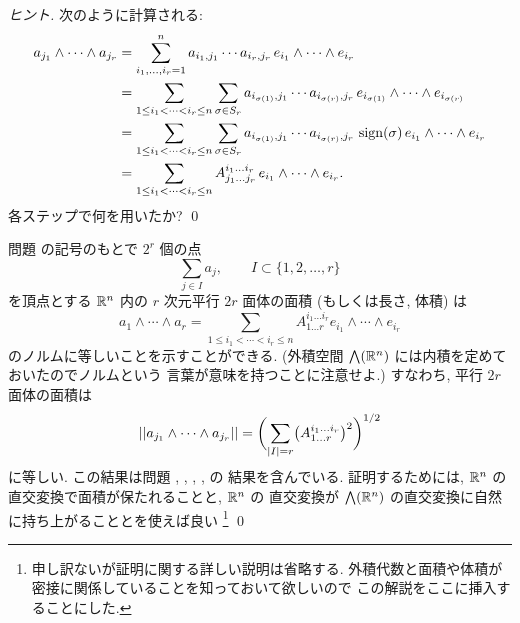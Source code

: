 \documentclass[12pt,twoside]{jarticle}
\begin{document}
\begin{proof}[ヒント]
  次のように計算される:
  \begin{align*}
    a_{j_1}\wedge\cdots\wedge a_{j_r}
    &
    = \sum_{i_1,\ldots,i_r=1}^n 
    a_{i_1,j_1}\cdots a_{i_r,j_r}
    \,e_{i_1}\wedge\cdots\wedge e_{i_r}
    \\ &
    = \sum_{1\le i_1<\cdots<i_r\le n}
    \sum_{\sigma\in S_r}
    a_{i_{\sigma(1)},j_1}\cdots a_{i_{\sigma(r)},j_r}
    \,e_{i_{\sigma(1)}}\wedge\cdots\wedge e_{i_{\sigma(r)}}
    \\ &
    = \sum_{1\le i_1<\cdots<i_r\le n}
    \sum_{\sigma\in S_r}
    a_{i_{\sigma(1)},j_1}\cdots a_{i_{\sigma(r)},j_r}
    \,\mathop{\mathrm{sign}}\nolimits(\sigma)\,e_{i_1}\wedge\cdots\wedge e_{i_r}
    \\ &
    = \sum_{1\le i_1<\cdots<i_r\le n}
    A^{i_1\ldots i_r}_{j_1\ldots j_r}
    \,e_{i_1}\wedge\cdots\wedge e_{i_r}.
  \end{align*}
  各ステップで何を用いたか?
  \qed
\end{proof}


\begin{guide}
  \label{guide:2r-parallelotope}
  問題  の記号のもとで $2^r$ 個の点
  \begin{equation*}
    \sum_{j\in I} a_j, \qquad I\subset\{1,2,\ldots,r\}
  \end{equation*}
  を頂点とする ${\mathbb R}^n$ 内の $r$ 次元平行 $2r$ 面体の面積
  (もしくは長さ, 体積) は
  \begin{equation*}
    a_1\wedge\cdots\wedge a_r
    = \sum_{1\le i_1<\cdots<i_r\le n} 
    A^{i_1\ldots i_r}_{1\ldots r} e_{i_1}\wedge\cdots\wedge e_{i_r}
  \end{equation*}
  のノルムに等しいことを示すことができる.
  (外積空間 $\bigwedge({\mathbb R}^n)$ には内積を定めておいたのでノルムという
  言葉が意味を持つことに注意せよ.)
  すなわち, 平行 $2r$ 面体の面積は
  \begin{equation*}
    \left|\left|a_{j_1}\wedge\cdots\wedge a_{j_r}\right|\right|
    = \biggl(
      \sum_{|I|=r}\bigl(A^{i_1\ldots i_r}_{1\ldots r}\bigr)^2
    \biggr)^{1/2}
  \end{equation*}
  に等しい.
  この結果は問題 , , 
  , ,  の
  結果を含んでいる.
  証明するためには, ${\mathbb R}^n$ の直交変換で面積が保たれることと, ${\mathbb R}^n$ の
  直交変換が $\bigwedge({\mathbb R}^n)$ の直交変換に自然に持ち上がることとを使えば良い%
  \footnote{申し訳ないが証明に関する詳しい説明は省略する. 
  外積代数と面積や体積が密接に関係していることを知っておいて欲しいので
  この解説をここに挿入することにした.}
  \qed
\end{guide}
\end{document}
